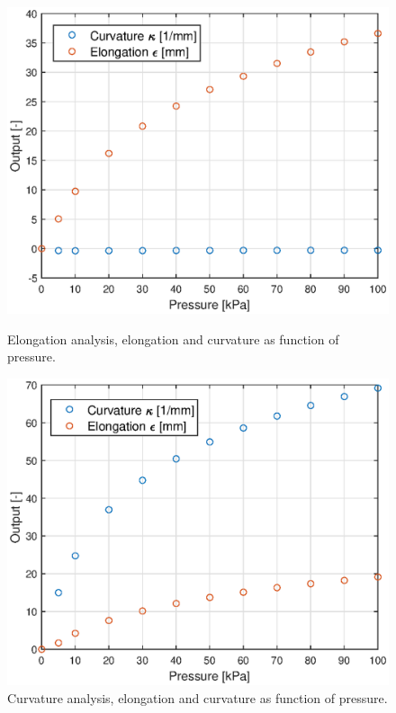 \begin{figure}[H]
    \centering
\begin{minipage}{0.5\textwidth}
        \centering
        \includegraphics[width=\textwidth]{Figures/Chapter3/elongationvspressure.eps} 
        \caption{Elongation analysis, elongation and curvature as function of pressure.}
        \label{fig3:elongationvspressure}
    \end{minipage}\hfill
    \begin{minipage}{0.5\textwidth}
        \centering
        \includegraphics[width=\textwidth]{Figures/Chapter3/rotationvspressure.eps} 
        \caption{Curvature analysis, elongation and curvature as function of pressure.}
        \label{fig3:rotationvspressure}
    \end{minipage}
\end{figure}


